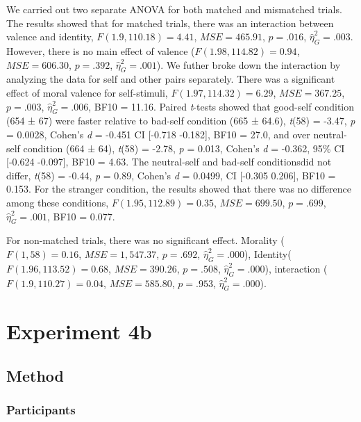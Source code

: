 \documentclass[man]{apa6}
\begin{document}
We carried out two separate ANOVA for both matched and mismatched trials. The results showed that for matched trials, there was an interaction between valence and identity, \(F(1.9, 110.18) = 4.41\), \(\mathit{MSE} = 465.91\), \(p = .016\), \(\hat{\eta}^2_G = .003\). However, there is no main effect of valence (\(F(1.98, 114.82) = 0.94\), \(\mathit{MSE} = 606.30\), \(p = .392\), \(\hat{\eta}^2_G = .001\)). We futher broke down the interaction by analyzing the data for self and other pairs separately. There was a significant effect of moral valence for self-stimuli, \(F(1.97, 114.32) = 6.29\), \(\mathit{MSE} = 367.25\), \(p = .003\), \(\hat{\eta}^2_G = .006\), BF10 = 11.16. Paired \emph{t}-tests showed that good-self condition (654 ± 67) were faster relative to bad-self condition (665 ± 64.6), \emph{t}(58) = -3.47, \emph{p} = 0.0028, Cohen's \emph{d} = -0.451 CI {[}-0.718 -0.182{]}, BF10 = 27.0, and over neutral-self condition (664 ± 64), \emph{t}(58) = -2.78, \emph{p} = 0.013, Cohen's \emph{d} = -0.362, 95\% CI {[}-0.624 -0.097{]}, BF10 = 4.63. The neutral-self and bad-self conditionsdid not differ, \emph{t}(58) = -0.44, \emph{p} = 0.89, Cohen's \emph{d} = 0.0499, CI {[}-0.305 0.206{]}, BF10 = 0.153. For the stranger condition, the results showed that there was no difference among these conditions, \(F(1.95, 112.89) = 0.35\), \(\mathit{MSE} = 699.50\), \(p = .699\), \(\hat{\eta}^2_G = .001\), BF10 = 0.077.

For non-matched trials, there was no significant effect. Morality (\(F(1, 58) = 0.16\), \(\mathit{MSE} = 1,547.37\), \(p = .692\), \(\hat{\eta}^2_G = .000\)), Identity(\(F(1.96, 113.52) = 0.68\), \(\mathit{MSE} = 390.26\), \(p = .508\), \(\hat{\eta}^2_G = .000\)), interaction (\(F(1.9, 110.27) = 0.04\), \(\mathit{MSE} = 585.80\), \(p = .953\), \(\hat{\eta}^2_G = .000\)).

\hypertarget{experiment-4b}{%
\section{Experiment 4b}\label{experiment-4b}}

\hypertarget{method-5}{%
\subsection{Method}\label{method-5}}

\hypertarget{participants-7}{%
\subsubsection{Participants}\label{participants-7}}
\end{document}
